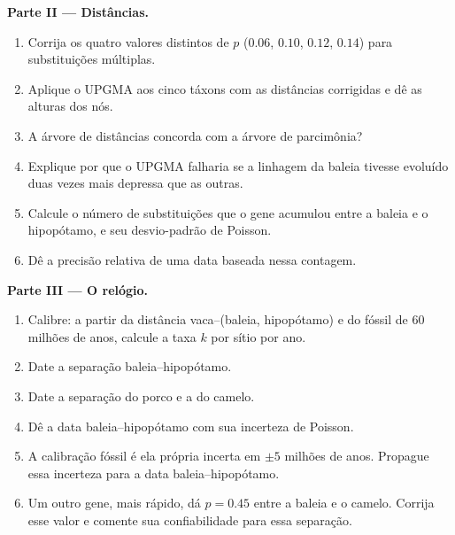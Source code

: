 \begin{problem}
\medskip
\noindent\textbf{Parte II --- Distâncias.}
\begin{enumerate}[resume]
  \item Corrija os quatro valores distintos de $p$ ($0.06$, $0.10$, $0.12$,
        $0.14$) para substituições múltiplas.
  \item Aplique o UPGMA aos cinco táxons com as distâncias corrigidas e
        dê as alturas dos nós.
  \item A árvore de distâncias concorda com a árvore de parcimônia?
  \item Explique por que o UPGMA falharia se a linhagem da baleia
        tivesse evoluído duas vezes mais depressa que as outras.
  \item Calcule o número de substituições que o gene acumulou entre a
        baleia e o hipopótamo, e seu desvio-padrão
        de Poisson.
  \item Dê a precisão relativa de uma data baseada nessa contagem.
\end{enumerate}

\medskip
\noindent\textbf{Parte III --- O relógio.}
\begin{enumerate}[resume]
  \item Calibre: a partir da distância vaca--(baleia, hipopótamo) e do
        fóssil de 60 milhões de anos, calcule a taxa $k$ por sítio por
        ano.
  \item Date a separação baleia--hipopótamo.
  \item Date a separação do porco e a do camelo.
  \item Dê a data baleia--hipopótamo com sua incerteza de Poisson.
  \item A calibração fóssil é ela própria incerta em $\pm 5$
        milhões de anos. Propague essa incerteza para a data baleia--hipopótamo.
  \item Um outro gene, mais rápido, dá $p = 0.45$ entre a baleia e o
        camelo. Corrija esse valor e comente sua confiabilidade para essa
        separação.
\end{enumerate}


\end{problem}
